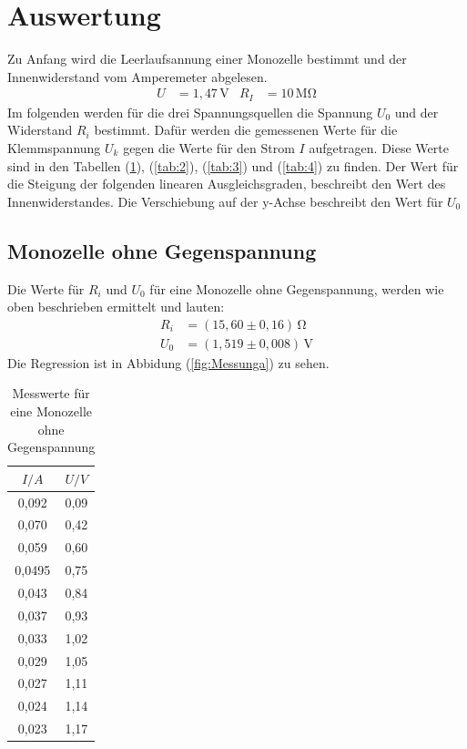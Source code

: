 \section{Auswertung}
Zu Anfang wird die Leerlaufsannung einer Monozelle bestimmt
und der Innenwiderstand vom Amperemeter abgelesen.
\begin{align*}
  U &= 1,47\, \mathrm{V} & R_I &= 10\, \mathrm{M\Omega}
\end{align*}
Im folgenden werden für die drei Spannungsquellen die Spannung $U_0$ und
der Widerstand $R_i$ bestimmt.
Dafür werden die gemessenen Werte für die Klemmspannung $U_k$
gegen die Werte für den Strom $I$ aufgetragen.
Diese Werte sind in den Tabellen (\ref{tab:1}), (\ref{tab:2}), (\ref{tab:3})
und (\ref{tab:4}) zu finden.
Der Wert für die Steigung der folgenden linearen Ausgleichsgraden,
beschreibt den Wert des Innenwiderstandes. Die Verschiebung auf der y-Achse
beschreibt den Wert für $U_0$
\subsection{Monozelle ohne Gegenspannung}
Die Werte für $R_i$ und $U_0$ für eine Monozelle ohne Gegenspannung,
werden wie oben beschrieben ermittelt und lauten:
\begin{align}
  R_i &= (15,60 \pm 0,16)\, \mathrm{\Omega}\\
  \label{eqn:ri}
  U_0 &= (1,519 \pm 0,008)\, \mathrm{V}
\end{align}
Die Regression ist in Abbidung (\ref{fig:Messunga}) zu sehen.
\begin{table}
  \centering
  \caption{Messwerte für eine Monozelle ohne Gegenspannung}
  \label{tab:1}
  \begin{tabular}{c c }
    \toprule $I/A$ & $U/V$ \\
    \midrule
    0,092 & 0,09\\
    0,070 & 0,42\\
    0,059 & 0,60\\
    0,0495 & 0,75\\
    0,043 & 0,84\\
    0,037 & 0,93\\
    0,033 & 1,02\\
    0,029 & 1,05\\
    0,027 & 1,11\\
    0,024 & 1,14\\
    0,023 & 1,17\\
    \bottomrule
  \end{tabular}
\end{table}

